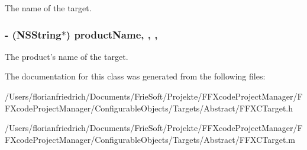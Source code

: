 The name of the target. \hypertarget{interface_f_f_x_c_target_ae9a82bea4f5083505b36fa31e67e8498}{
\subsubsection[{product\-Name}]{\setlength{\rightskip}{0pt plus 5cm}-\/ (N\-S\-String$\ast$) product\-Name\hspace{0.3cm}{\ttfamily [read]}, {\ttfamily [write]}, {\ttfamily [nonatomic]}, {\ttfamily [strong]}}}\label{interface_f_f_x_c_target_ae9a82bea4f5083505b36fa31e67e8498}
The product's name of the target. 

The documentation for this class was generated from the following files\-:\begin{DoxyCompactItemize}
\item 
/\-Users/florianfriedrich/\-Documents/\-Frie\-Soft/\-Projekte/\-F\-F\-Xcode\-Project\-Manager/\-F\-F\-Xcode\-Project\-Manager/\-Configurable\-Objects/\-Targets/\-Abstract/F\-F\-X\-C\-Target.\-h\item 
/\-Users/florianfriedrich/\-Documents/\-Frie\-Soft/\-Projekte/\-F\-F\-Xcode\-Project\-Manager/\-F\-F\-Xcode\-Project\-Manager/\-Configurable\-Objects/\-Targets/\-Abstract/F\-F\-X\-C\-Target.\-m\end{DoxyCompactItemize}
